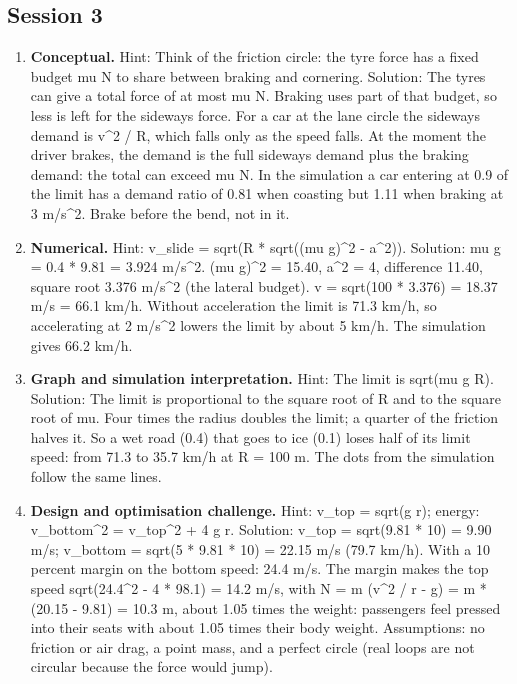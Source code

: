 \documentclass[11pt,a4paper]{article}
\begin{document}
\subsection*{Session 3}
\begin{enumerate}[nosep]
\item \textbf{Conceptual.} Hint: Think of the friction circle: the tyre force has a fixed budget mu N to share between braking and cornering. Solution: The tyres can give a total force of at most mu N. Braking uses part of that budget, so less is left for the sideways force. For a car at the lane circle the sideways demand is v\textasciicircum{}2 / R, which falls only as the speed falls. At the moment the driver brakes, the demand is the full sideways demand plus the braking demand: the total can exceed mu N. In the simulation a car entering at 0.9 of the limit has a demand ratio of 0.81 when coasting but 1.11 when braking at 3 m/s\textasciicircum{}2. Brake before the bend, not in it.
\item \textbf{Numerical.} Hint: v\_slide = sqrt(R * sqrt((mu g)\textasciicircum{}2 - a\textasciicircum{}2)). Solution: mu g = 0.4 * 9.81 = 3.924 m/s\textasciicircum{}2. (mu g)\textasciicircum{}2 = 15.40, a\textasciicircum{}2 = 4, difference 11.40, square root 3.376 m/s\textasciicircum{}2 (the lateral budget). v = sqrt(100 * 3.376) = 18.37 m/s = 66.1 km/h. Without acceleration the limit is 71.3 km/h, so accelerating at 2 m/s\textasciicircum{}2 lowers the limit by about 5 km/h. The simulation gives 66.2 km/h.
\item \textbf{Graph and simulation interpretation.} Hint: The limit is sqrt(mu g R). Solution: The limit is proportional to the square root of R and to the square root of mu. Four times the radius doubles the limit; a quarter of the friction halves it. So a wet road (0.4) that goes to ice (0.1) loses half of its limit speed: from 71.3 to 35.7 km/h at R = 100 m. The dots from the simulation follow the same lines.
\item \textbf{Design and optimisation challenge.} Hint: v\_top = sqrt(g r); energy: v\_bottom\textasciicircum{}2 = v\_top\textasciicircum{}2 + 4 g r. Solution: v\_top = sqrt(9.81 * 10) = 9.90 m/s; v\_bottom = sqrt(5 * 9.81 * 10) = 22.15 m/s (79.7 km/h). With a 10 percent margin on the bottom speed: 24.4 m/s. The margin makes the top speed sqrt(24.4\textasciicircum{}2 - 4 * 98.1) = 14.2 m/s, with N = m (v\textasciicircum{}2 / r - g) = m * (20.15 - 9.81) = 10.3 m, about 1.05 times the weight: passengers feel pressed into their seats with about 1.05 times their body weight. Assumptions: no friction or air drag, a point mass, and a perfect circle (real loops are not circular because the force would jump).
\end{enumerate}
\end{document}
